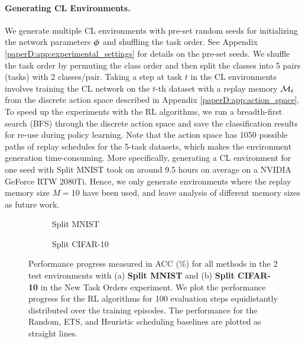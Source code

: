 \paragraph{Generating CL Environments.} We generate multiple CL environments with pre-set random seeds for initializing the network parameters ${\bm{\phi}}$ and shuffling the task order. See Appendix \ref{paperD:app:experimental_settings} for details on the pre-set seeds. 
We shuffle the task order by permuting the class order and then split the classes into 5 pairs (tasks) with 2 classes/pair. 
Taking a step at task $t$ in the CL environments involves training the CL network on the $t$-th dataset with a replay memory ${\mathcal{M}}_t$ from the discrete action space described in Appendix \ref{paperD:app:action_space}. 
To speed up the experiments with the RL algorithms, we run a breadth-first search (BFS) through the discrete action space and save the classification results for re-use during policy learning. Note that the action space has 1050 possible paths of replay schedules for the 5-task datasets, which makes the environment generation time-consuming. More specifically, generating a CL environment for one seed with Split MNIST took on around 9.5 hours on average on a NVIDIA GeForce RTW 2080Ti.   
Hence, we only generate environments where the replay memory size $M=10$ have been used, and leave analysis of different memory sizes as future work. 

\begin{figure}[t]
	\centering
	\setlength{\figwidth}{0.26\textwidth}
	\setlength{\figheight}{.14\textheight}
	\begin{subfigure}[t]{0.48\textwidth}
		\centering
		
		\vspace{-4mm} %
		\caption{Split MNIST}
		\label{fig:rewards_mnist_2envs}
	\end{subfigure}%
	\begin{subfigure}[t]{0.48\textwidth}
		\centering
		
		\caption{Split CIFAR-10}
		\label{fig:rewards_cifar10_2envs}
	\end{subfigure}
	\vspace{-2mm}
	\caption{Performance progress measured in ACC (\%) for all methods in the 2 test environments with (a) {\bf Split MNIST} and (b) {\bf Split CIFAR-10} in the New Task Orders experiment. We plot the performance progress for the RL algorithms for 100 evaluation steps equidistantly distributed over the training episodes. The performance for the Random, ETS, and Heuristic scheduling baselines are plotted as straight lines.  }
	\label{fig:rewards_new_task_orders_2envs}
	\vspace{-2mm}
\end{figure}


